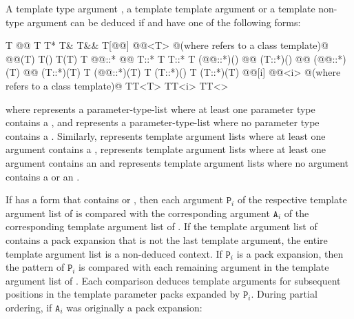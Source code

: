 \pnum
A template type argument
,
a template template argument
or a template non-type argument
can be deduced if
and
have one of the following forms:

\begin{codeblock}
T
@\cv{}@ T
T*
T&
T&&
T[@@]
@@<T>  @\textrm{(where  refers to a class template)}@
@@(T)
T()
T(T)
T @@::*
@@ T::*
T T::*
T (@@::*)()
@@ (T::*)()
@@ (@@::*)(T)
@@ (T::*)(T)
T (@@::*)(T)
T (T::*)()
T (T::*)(T)
@@[i]
@@<i>  @\textrm{(where  refers to a class template)}@
TT<T>
TT<i>
TT<>
\end{codeblock}

where
represents
a parameter-type-list
where at least one parameter type contains a
,
and
\tcode{()}
represents
a parameter-type-list
where no parameter type contains a
.
Similarly,
represents template argument lists where at least one argument contains a
,
represents template argument lists where at least one argument contains an
and
\tcode{<>}
represents template argument lists where no argument contains a
or an
.

\pnum
If  has a form that contains 
or , then each argument $\mathtt{P}_i$ of the
respective template argument list of  is compared with the
corresponding argument $\mathtt{A}_i$ of the corresponding
template argument list of . If the template argument list
of  contains a pack expansion that is not the last
template argument, the entire template argument list is a non-deduced
context. If $\texttt{P}_i$ is a pack expansion, then the pattern
of $\texttt{P}_i$ is compared with each remaining argument in the
template argument list of . Each comparison deduces
template arguments for subsequent positions in the template parameter
packs expanded by $\texttt{P}_i$.
During partial ordering, if $\texttt{A}_i$ was
originally a pack expansion:

